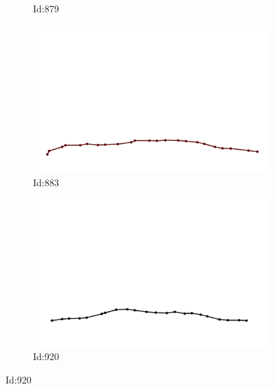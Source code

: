 \documentclass[12pt,twoside]{report}
\begin{document}
\begin{figure}
\begin{subfigure}[b]{0.20\textwidth}
\caption{Id:879}
\end{subfigure}
\begin{subfigure}[b]{0.20\textwidth}
\centering
\includegraphics[width=\textwidth]{../../trajectories/883.png}
\caption{Id:883}
\end{subfigure}
\begin{subfigure}[b]{0.20\textwidth}
\centering
\includegraphics[width=\textwidth]{../../trajectories/920.png}
\caption{Id:920}
\end{subfigure}
\end{figure}
\end{document}
